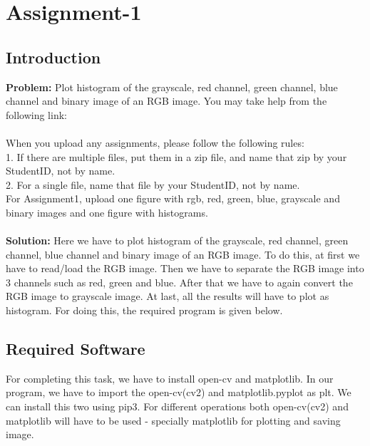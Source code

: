 \documentclass{article}
\begin{document}
{
    \section{Assignment-1}
    \setcounter{page}{1}
    \subsection{Introduction}
    \textbf {Problem: }
    Plot histogram of the grayscale, red channel, green channel, blue channel and binary image of an RGB image. You may take help from the following link:\\
    \\
    
    When you upload any assignments, please follow the following rules:\\
    1. If there are multiple files, put them in a zip file, and name that zip by your StudentID, not by name.\\
    2. For a single file, name that file by your StudentID, not by name.\\
    For Assignment1, upload one figure with rgb, red, green, blue, grayscale and binary  images and one figure with histograms.\\
    \\
    \textbf{Solution: }
    Here we have to plot histogram of the grayscale, red channel, green channel, blue channel and binary image of an RGB image. To do this, at first we have to read/load the RGB image. Then we have to separate the RGB image into 3 channels such as red, green and blue. After that we have to again convert the RGB image to grayscale image. At last, all the results will have to plot as histogram. For doing this, the required program is given below.
    \\
    
    \subsection{Required Software}
    For completing this task, we have to install open-cv and matplotlib. In our program, we have to import the open-cv(cv2) and matplotlib.pyplot as plt. We can install this two using pip3. For different operations both open-cv(cv2) and matplotlib will have to be used - specially matplotlib for plotting and saving image. 
    \\
    
}
\end{document}
